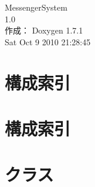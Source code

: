 \documentclass[a4paper]{book}
\begin{document}
\hypersetup{pageanchor=false}
\begin{titlepage}
\vspace*{7cm}
\begin{center}
{\Large MessengerSystem \\[1ex]\large 1.0 }\\
\vspace*{1cm}
{\large 作成： Doxygen 1.7.1}\\
\vspace*{0.5cm}
{\small Sat Oct 9 2010 21:28:45}\\
\end{center}
\end{titlepage}
\clearemptydoublepage
{}
\tableofcontents
\clearemptydoublepage
{}
\hypersetup{pageanchor=true}
\chapter{構成索引}

\chapter{構成索引}

\chapter{クラス}







\printindex
\end{document}
